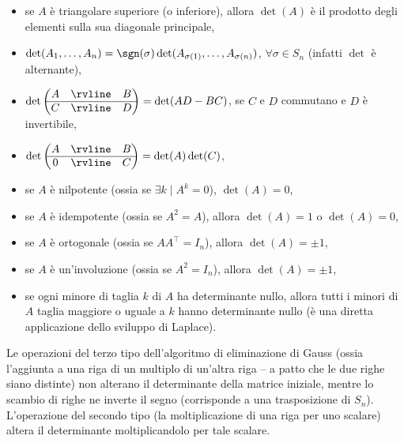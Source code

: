 \documentclass[10pt,landscape]{article}
\begin{document}
\begin{multicols}{3}
\begin{itemize}
			\item se $A$ è triangolare superiore (o inferiore), allora $\det(A)$ è
			il prodotto degli elementi sulla sua diagonale principale,
			\item $\det(A_1, \ldots, A_n) = \sgn(\sigma) \det(A_{\sigma(1)}, \ldots, A_{\sigma(n)})$, $\forall \sigma \in S_n$ (infatti $\det$ è alternante),
			\item \setlength{\extrarowheight}{1.3pt}$\det \begin{pmatrix}
				A
				& \rvline & B \\
				\hline
				C & \rvline &
				D
			\end{pmatrix} = \det(AD-BC)$, se $C$ e $D$ commutano e $D$ è invertibile,
			\item $\det \begin{pmatrix}
				A
				& \rvline & B \\
				\hline
				0 & \rvline &
				C
			\end{pmatrix} = \det(A)\det(C)$\setlength{\extrarowheight}{0pt},
			\item se $A$ è nilpotente (ossia se $\exists k \mid A^k = 0$),
			$\det(A) = 0$,
			\item se $A$ è idempotente (ossia se $A^2 = A$), allora
			$\det(A) = 1$ o $\det(A) = 0$,
			\item se $A$ è ortogonale (ossia se $AA^\top = I_n$), allora
			$\det(A) = \pm 1$,
			\item se $A$ è un'involuzione (ossia se $A^2 = I_n$), allora
			$\det(A) = \pm 1$,
			\item se ogni minore di taglia $k$ di $A$ ha determinante nullo,
			allora tutti i minori di $A$ taglia maggiore o uguale a $k$ hanno
			determinante nullo (è una diretta applicazione dello sviluppo di Laplace).
		\end{itemize}
		
		Le operazioni del terzo tipo dell'algoritmo di eliminazione
		di Gauss (ossia l'aggiunta a una riga di un multiplo di un'altra
		riga -- a patto che le due righe siano distinte) non alterano il
		determinante della matrice iniziale, mentre lo scambio di righe
		ne inverte il segno (corrisponde a una trasposizione di $S_n$).
		L'operazione del secondo tipo (la moltiplicazione di una riga
		per uno scalare) altera il determinante moltiplicandolo per
		tale scalare.
		

\end{multicols}
\end{document}

